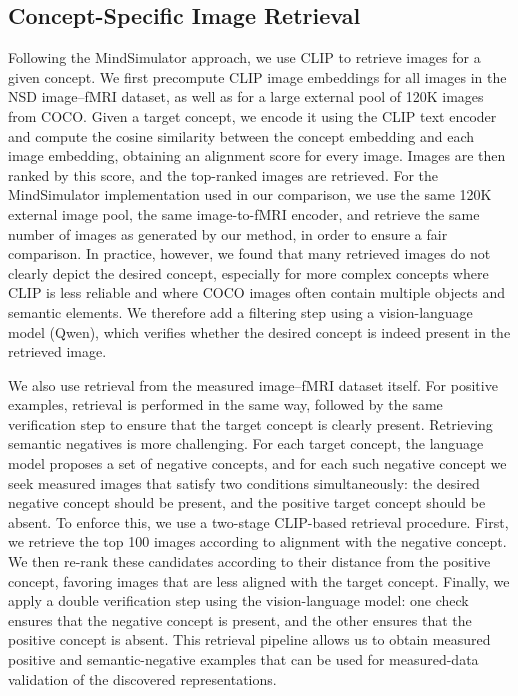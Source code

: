 \documentclass{llmxive}
\begin{document}
\subsection{Concept-Specific Image Retrieval}
\label{sec_sup:Image_Retrieval}

Following the MindSimulator approach, we use CLIP to retrieve images for a given concept. We first precompute CLIP image embeddings for all images in the NSD image--fMRI dataset, as well as for a large external pool of 120K images from COCO. Given a target concept, we encode it using the CLIP text encoder and compute the cosine similarity between the concept embedding and each image embedding, obtaining an alignment score for every image. Images are then ranked by this score, and the top-ranked images are retrieved. For the MindSimulator implementation used in our comparison, we use the same 120K external image pool, the same image-to-fMRI encoder, and retrieve the same number of images as generated by our method, in order to ensure a fair comparison. In practice, however, we found that many retrieved images do not clearly depict the desired concept, especially for more complex concepts where CLIP is less reliable and where COCO images often contain multiple objects and semantic elements. We therefore add a filtering step using a vision-language model (Qwen), which verifies whether the desired concept is indeed present in the retrieved image.

We also use retrieval from the measured image--fMRI dataset itself. For positive examples, retrieval is performed in the same way, followed by the same verification step to ensure that the target concept is clearly present. Retrieving semantic negatives is more challenging. For each target concept, the language model proposes a set of negative concepts, and for each such negative concept we seek measured images that satisfy two conditions simultaneously: the desired negative concept should be present, and the positive target concept should be absent. To enforce this, we use a two-stage CLIP-based retrieval procedure. First, we retrieve the top 100 images according to alignment with the negative concept. We then re-rank these candidates according to their distance from the positive concept, favoring images that are less aligned with the target concept. Finally, we apply a double verification step using the vision-language model: one check ensures that the negative concept is present, and the other ensures that the positive concept is absent. This retrieval pipeline allows us to obtain measured positive and semantic-negative examples that can be used for measured-data validation of the discovered representations.
\end{document}
